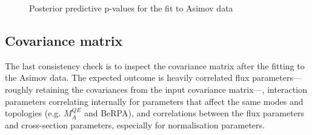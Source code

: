 \begin{figure}[h]
\begin{subfigure}[t]{0.49\textwidth}
	\end{subfigure}
\caption{Posterior predictive p-values for the fit to Asimov data}
\label{fig:posterior_predictive_asimov}
\end{figure}

\subsection{Covariance matrix}
\label{sec:covariance_asimov}
The last consistency check is to inspect the covariance matrix after the fitting to the Asimov data. The expected outcome is heavily correlated flux parameters---roughly retaining the covariances from the input covariance matrix---, interaction parameters correlating internally for parameters that affect the same modes and topologies (e.g. $M_A^{QE}$ and BeRPA), and correlations between the flux parameters and cross-section parameters, especially for normalisation parameters.

